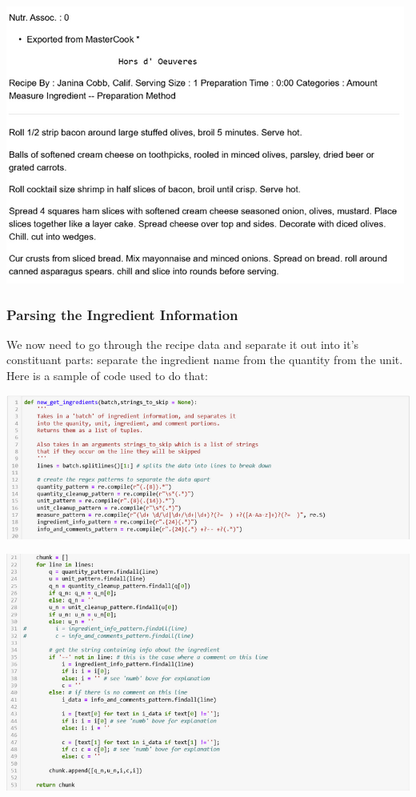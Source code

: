 \documentclass[11pt]{article}
\makeatletter
\def\maxwidth{\ifdim\Gin@nat@width>\linewidth\linewidth
    \else\Gin@nat@width\fi}
\let\Oldincludegraphics\includegraphics
\renewcommand{\includegraphics}[1]{\Oldincludegraphics[width=.8\maxwidth]{#1}}
\makeatother
\begin{document}
\includegraphics{bad_recipe.png}

    \hypertarget{parsing-the-ingredient-information}{%
\subsubsection{Parsing the Ingredient
Information}\label{parsing-the-ingredient-information}}

We now need to go through the recipe data and separate it out into it's
constituant parts: separate the ingredient name from the quantity from
the unit. Here is a sample of code used to do that:

\includegraphics{screen3.png}

    \includegraphics{split4.png}
\end{document}
